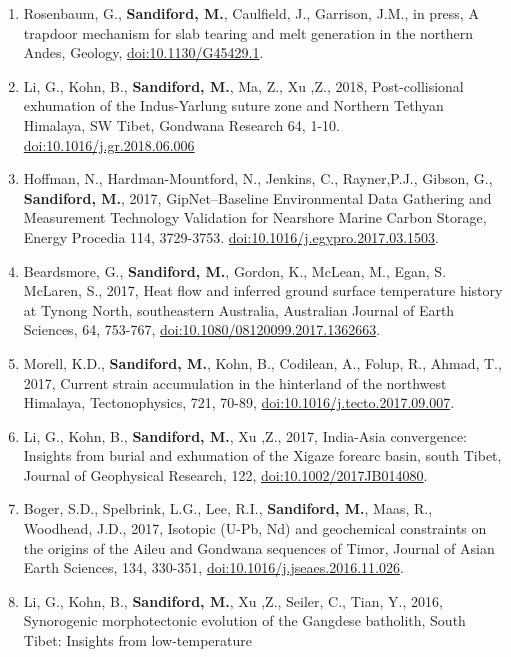 \documentclass[
]{article}
\begin{document}
\begin{enumerate}
\def\labelenumi{\arabic{enumi}.}
\item
  Rosenbaum, G., \textbf{Sandiford, M.}, Caulfield, J., Garrison, J.M.,
  in press, A trapdoor mechanism for slab tearing and melt generation in
  the northern Andes, Geology, \url{doi:10.1130/G45429.1}.
\item
  Li, G., Kohn, B., \textbf{Sandiford, M.}, Ma, Z., Xu ,Z., 2018,
  Post-collisional exhumation of the Indus-Yarlung suture zone and
  Northern Tethyan Himalaya, SW Tibet, Gondwana Research 64, 1-10.
  \url{doi:10.1016/j.gr.2018.06.006}
\item
  Hoffman, N., Hardman-Mountford, N., Jenkins, C., Rayner,P.J., Gibson,
  G., \textbf{Sandiford, M.}, 2017, GipNet--Baseline Environmental Data
  Gathering and Measurement Technology Validation for Nearshore Marine
  Carbon Storage, Energy Procedia 114, 3729-3753.
  \url{doi:10.1016/j.egypro.2017.03.1503}.
\item
  Beardsmore, G., \textbf{Sandiford, M.}, Gordon, K., McLean, M., Egan,
  S. McLaren, S., 2017, Heat flow and inferred ground surface
  temperature history at Tynong North, southeastern Australia,
  Australian Journal of Earth Sciences, 64, 753-767,
  \url{doi:10.1080/08120099.2017.1362663}. 
\item
  Morell, K.D., \textbf{Sandiford, M.}, Kohn, B., Codilean, A., Folup,
  R., Ahmad, T., 2017, Current strain accumulation in the hinterland of
  the northwest Himalaya, Tectonophysics, 721, 70-89,
  \url{doi:10.1016/j.tecto.2017.09.007}. 
\item
  Li, G., Kohn, B., \textbf{Sandiford, M.}, Xu ,Z., 2017, India-Asia
  convergence: Insights from burial and exhumation of the Xigaze forearc
  basin, south Tibet, Journal of Geophysical Research, 122,
  \url{doi:10.1002/2017JB014080}. 
\item
  Boger, S.D., Spelbrink, L.G., Lee, R.I., \textbf{Sandiford, M.}, Maas,
  R., Woodhead, J.D., 2017, Isotopic (U-Pb, Nd) and geochemical
  constraints on the origins of the Aileu and Gondwana sequences of
  Timor, Journal of Asian Earth Sciences, 134, 330-351,
  \url{doi:10.1016/j.jseaes.2016.11.026}. 
\item
  Li, G., Kohn, B., \textbf{Sandiford, M.}, Xu ,Z., Seiler, C., Tian,
  Y., 2016, Synorogenic morphotectonic evolution of the Gangdese
  batholith, South Tibet: Insights from low-temperature

\end{enumerate}
\end{document}
